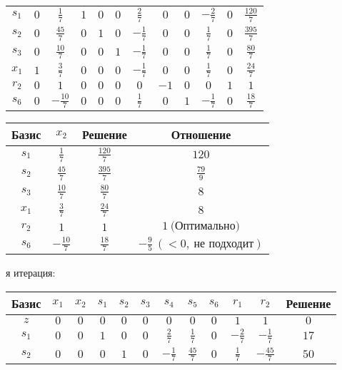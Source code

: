 \documentclass{article}%
\begin{document}
\begin{flushleft}
\begin{tabular}{|c|cccccccccc|c|}
\hline%
$s_{1}$&$0$&$\frac{1}{7}$&$1$&$0$&$0$&$\frac{2}{7}$&$0$&$0$&$-\frac{2}{7}$&$0$&$\frac{120}{7}$\\%
$s_{2}$&$0$&$\frac{45}{7}$&$0$&$1$&$0$&$-\frac{1}{7}$&$0$&$0$&$\frac{1}{7}$&$0$&$\frac{395}{7}$\\%
$s_{3}$&$0$&$\frac{10}{7}$&$0$&$0$&$1$&$-\frac{1}{7}$&$0$&$0$&$\frac{1}{7}$&$0$&$\frac{80}{7}$\\%
$x_{1}$&$1$&$\frac{3}{7}$&$0$&$0$&$0$&$-\frac{1}{7}$&$0$&$0$&$\frac{1}{7}$&$0$&$\frac{24}{7}$\\%
$r_{2}$&$0$&$1$&$0$&$0$&$0$&$0$&$-1$&$0$&$0$&$1$&$1$\\%
$s_{6}$&$0$&$-\frac{10}{7}$&$0$&$0$&$0$&$\frac{1}{7}$&$0$&$1$&$-\frac{1}{7}$&$0$&$\frac{18}{7}$\\%
\hline%
\end{tabular}%
\newline%
\newline%
\newline%
\begin{tabular}{|cccc|}%
\hline%
Базис&$x_{2}$&Решение&Отношение\\%
\hline%
$s_{1}$&$\frac{1}{7}$&$\frac{120}{7}$&$120$\\%
$s_{2}$&$\frac{45}{7}$&$\frac{395}{7}$&$\frac{79}{9}$\\%
$s_{3}$&$\frac{10}{7}$&$\frac{80}{7}$&$8$\\%
$x_{1}$&$\frac{3}{7}$&$\frac{24}{7}$&$8$\\%
$r_{2}$&$1$&$1$&$1\: \text{(Оптимально)}$\\%
$s_{6}$&$-\frac{10}{7}$&$\frac{18}{7}$&$-\frac{9}{5}\: (< 0, \: \text{не подходит})$\\%
\hline%
\end{tabular}%
\newline%
\newline%
я итерация: %
\newline%
\newline%
\renewcommand{\arraystretch}{1.3}%
\begin{tabular}{|c|cccccccccc|c|}%
\hline%
Базис&$x_{1}$&$x_{2}$&$s_{1}$&$s_{2}$&$s_{3}$&$s_{4}$&$s_{5}$&$s_{6}$&$r_{1}$&$r_{2}$&Решение\\%
\hline%
$z$&$0$&$0$&$0$&$0$&$0$&$0$&$0$&$0$&$1$&$1$&$0$\\%
\hline%
$s_{1}$&$0$&$0$&$1$&$0$&$0$&$\frac{2}{7}$&$\frac{1}{7}$&$0$&$-\frac{2}{7}$&$-\frac{1}{7}$&$17$\\%
$s_{2}$&$0$&$0$&$0$&$1$&$0$&$-\frac{1}{7}$&$\frac{45}{7}$&$0$&$\frac{1}{7}$&$-\frac{45}{7}$&$50$\\%

\end{tabular}
\end{flushleft}
\end{document}
